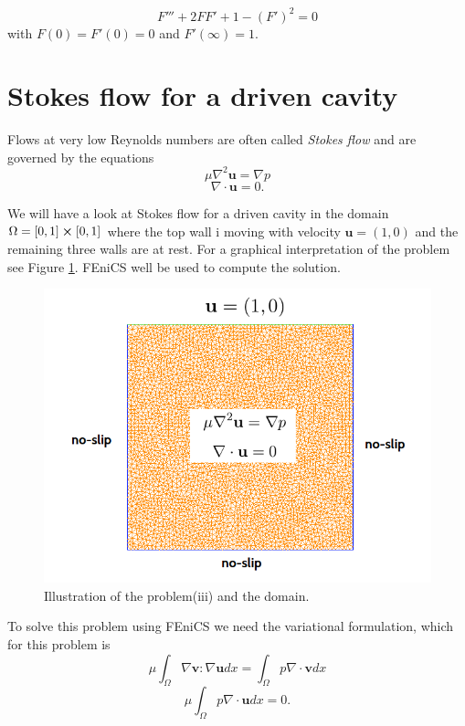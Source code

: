 \documentclass[11pt,a4paper,english]{article}
\numberwithin{equation}{section}
\begin{document}
\begin{equation}
F''' + 2FF' + 1 - (F')^2 = 0
\end{equation}
with $F(0) = F'(0) = 0$ and $F'(\infty)=1$.


\section{Stokes flow for a driven cavity}
Flows at very low Reynolds numbers are often called \emph{Stokes flow} and are governed by the equations 
\begin{equation}
\mu \nabla^2 \mathbf{u} = \nabla p
\end{equation}
\begin{equation}
\nabla \cdot \mathbf{u} = 0.
\end{equation}

We will have a look at Stokes flow for a driven cavity in the domain $\Omega = [0,1] \cross [0,1]$ where the top wall i moving with velocity $\mathbf{u} = (1,0)$ and the remaining three walls are at rest. For a graphical interpretation of the problem see Figure \ref{fig:stokes_square}. FEniCS well be used to compute the solution. 

\begin{figure}[h!]
\begin{center}
  \includegraphics[scale=0.4]{stokes_square.png}
  \end{center}
  \caption{Illustration of the problem(iii) and the domain.}
  \label{fig:stokes_square}
\end{figure}

To solve this problem using FEniCS we need the variational formulation, which for this problem is
\begin{equation}
\mu \int_\Omega \nabla \mathbf{v}:\nabla \mathbf{u} dx = \int_\Omega p \nabla \cdot \mathbf{v} dx 
\end{equation}
\begin{equation}
\mu \int_\Omega p\nabla \cdot \mathbf{u} dx = 0.
\end{equation}
\end{document}

